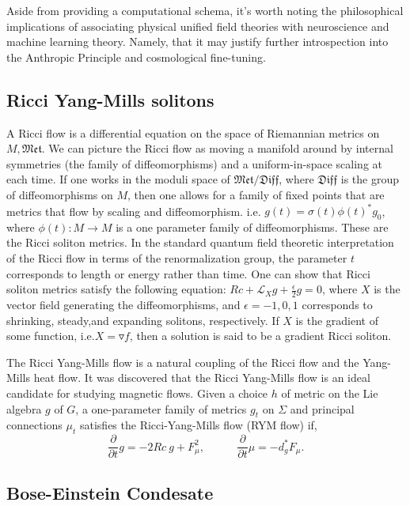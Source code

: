 \documentclass{article}
\begin{document}
    Aside from providing a computational schema, it's worth noting the philosophical implications of associating physical unified field theories with neuroscience and machine learning theory. Namely, that it  may justify further introspection into the Anthropic Principle and cosmological fine-tuning.

    \subsection{Ricci Yang-Mills solitons}
    
    A Ricci flow is a differential equation on the space of Riemannian metrics on $M, \mathfrak{Met}$. We can picture the Ricci flow as moving a manifold around by internal symmetries (the family of diffeomorphisms) and a uniform-in-space scaling at each time. If one works in the moduli space of $\mathfrak{Met}/ \mathfrak{Diff}$, where $\mathfrak{Diff}$ is the group of diffeomorphisms on $M$, then one allows for a family of fixed points that are metrics that flow by scaling and diffeomorphism. i.e. $g(t) = \sigma (t) \phi (t) ^* g_0$,
    where $\phi(t) :M \rightarrow M$ is a one parameter family of diffeomorphisms. 
    These are the Ricci soliton metrics. 
    In the standard quantum field theoretic interpretation of the Ricci flow in terms of the renormalization group, the parameter $t$ corresponds to length or energy rather than time.
    One can show that Ricci soliton metrics satisfy the following equation: $Rc+\mathcal{L}_X g+ 
    \frac{\epsilon}{2} g = 0$, where $X$ is the vector field generating the diffeomorphisms, and $\epsilon = -1,0,1$ corresponds to shrinking, steady,and expanding solitons, respectively. If $X$ is the gradient of some function, i.e.$X=\triangledown f$, then a solution is said to be a gradient Ricci soliton.
    
    The Ricci Yang-Mills flow is a natural coupling of the Ricci flow and the Yang-Mills heat flow. It was discovered that the Ricci Yang-Mills flow is an ideal candidate for studying magnetic flows. Given a choice $h$ of metric on the Lie algebra $g$ of $G$, a one-parameter family of metrics $g_t$ on $\Sigma$ and principal connections $\mu_t$ satisfies the Ricci-Yang-Mills flow (RYM flow) if, 
    \begin{equation}
        \frac{\partial}{\partial t} g = -2 Rc \ g + F^2_\mu,  \ \ \ \ \ \ \ \ \ \ \ \ \ 
        \frac{\partial}{\partial t}\mu = -d^*_gF_\mu .
    \end{equation}
    \subsection{Bose-Einstein Condesate}
    
\end{document}
